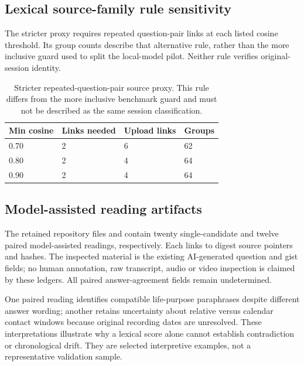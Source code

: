 \subsection{Lexical source-family rule sensitivity}

The stricter proxy requires repeated question-pair links at each listed cosine threshold. Its group counts describe that alternative rule, rather than the more inclusive guard used to split the local-model pilot. Neither rule verifies original-session identity.

\begin{table}[t]
\centering\small\setlength{\tabcolsep}{3pt}
\begin{tabular}{p{}p{}p{}p{}}
\toprule
Min cosine & Links needed & Upload links & Groups \\ \midrule
0.70 & 2 & 6 & 62 \\
0.80 & 2 & 4 & 64 \\
0.90 & 2 & 4 & 64 \\
\bottomrule
\end{tabular}
\caption{Stricter repeated-question-pair source proxy. This rule differs from the more inclusive benchmark guard and must not be described as the same session classification.}
\end{table}

\subsection{Model-assisted reading artifacts}

The retained repository files  and  contain twenty single-candidate and twelve paired model-assisted readings, respectively. Each links to digest source pointers and hashes. The inspected material is the existing AI-generated question and gist fields; no human annotation, raw transcript, audio or video inspection is claimed by these ledgers. All paired answer-agreement fields remain undetermined.

One paired reading identifies compatible life-purpose paraphrases despite different answer wording; another retains uncertainty about relative versus calendar contact windows because original recording dates are unresolved. These interpretations illustrate why a lexical score alone cannot establish contradiction or chronological drift. They are selected interpretive examples, not a representative validation sample.
